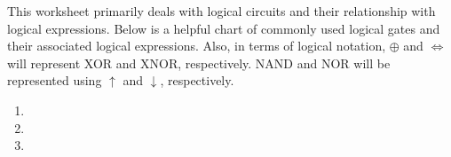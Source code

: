 
This worksheet primarily deals with logical circuits and their relationship with logical expressions. Below is a helpful chart of commonly used logical gates and their associated logical expressions. Also, in terms of logical notation, $\oplus$ and $\iff$ will represent XOR and XNOR, respectively. NAND and NOR will be represented using $\uparrow$ and $\downarrow$, respectively.
 \begin{enumerate}
   \item 
   \item 
   \item 
 \end{enumerate}
